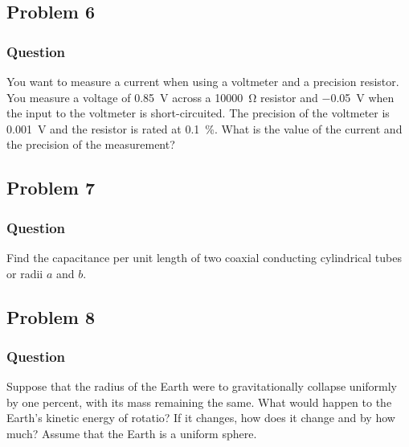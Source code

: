 \clearpage
\subsection{Problem 6}
\subsubsection{Question}
You want to measure a current when using a voltmeter and a precision resistor.
You measure a voltage of \SI{0.85}{\V} across a \SI{10000}{\ohm} resistor and
\SI{-0.05}{\V} when the input to the voltmeter is short-circuited. The precision
of the voltmeter is \SI{0.001}{\V} and the resistor is rated at
\SI{0.1}{\percent}. What is the value of the current and the precision of the
measurement?

\clearpage
\subsection{Problem 7}
\subsubsection{Question}
Find the capacitance per unit length of two coaxial conducting cylindrical tubes
or radii $a$ and $b$.

\clearpage
\subsection{Problem 8}
\subsubsection{Question}
Suppose that the radius of the Earth were to gravitationally collapse uniformly
by one percent, with its mass remaining the same. What would happen to the
Earth's kinetic energy of rotatio? If it changes, how does it change and by how
much? Assume that the Earth is a uniform sphere.

\clearpage

